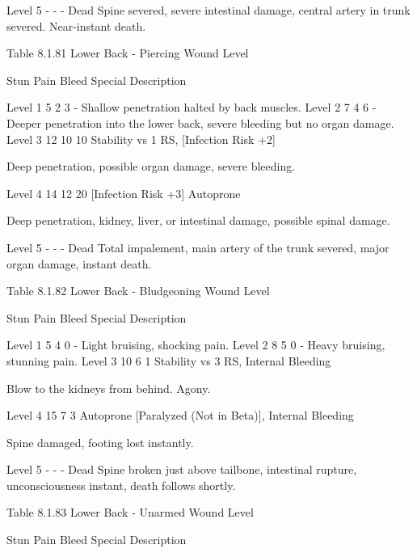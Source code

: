 \documentclass[oneside,11pt,english]{book}
\begin{document}
Level 5 - - - Dead Spine severed, severe intestinal damage, central artery in 
trunk severed. Near-instant death. 

 
Table 8.1.81 Lower Back - Piercing 
Wound 
Level 

Stun Pain Bleed Special Description 

Level 1 5 2 3 - Shallow penetration halted by back muscles. 
Level 2 7 4 6 - Deeper penetration into the lower back, severe 
bleeding but no organ damage. 
Level 3 12 10 10 Stability vs 1 RS, 
[Infection Risk +2] 

Deep penetration, possible organ damage, severe 
bleeding. 

Level 4 14 12 20 [Infection Risk +3] 
Autoprone 

 

Deep penetration, kidney, liver, or intestinal 
damage, possible spinal damage. 

Level 5 - - - Dead Total impalement, main artery of the trunk severed, 
major organ damage, instant death. 

 
Table 8.1.82 Lower Back - Bludgeoning 
Wound 
Level 

Stun Pain Bleed Special Description 

Level 1 5 4 0 - Light bruising, shocking pain. 
Level 2 8 5 0 - Heavy bruising, stunning pain. 
Level 3 10 6 1 Stability vs 3 RS, 
Internal Bleeding 

Blow to the kidneys from behind. Agony. 

Level 4 15 7 3 Autoprone 
[Paralyzed (Not in 
Beta)], Internal Bleeding 

Spine damaged, footing lost instantly. 


Level 5 - - - Dead Spine broken just above tailbone, intestinal rupture, 
unconsciousness instant, death follows shortly. 

 
Table 8.1.83 Lower Back - Unarmed 
Wound 
Level 

Stun Pain Bleed Special Description 

\end{document}
